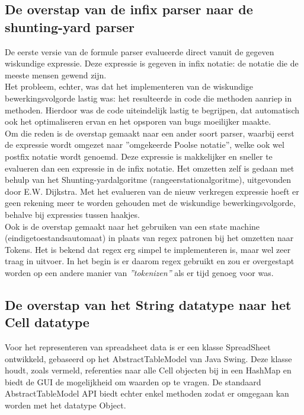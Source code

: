 \documentclass[a4paper,11pt,titlepage]{scrartcl}
\begin{document}
\subsection{De overstap van de infix parser naar de shunting-yard parser}
De eerste versie van de formule parser evalueerde direct vanuit de gegeven wiskundige expressie. Deze expressie is gegeven in infix notatie: de notatie die de meeste mensen gewend zijn.\\

Het probleem, echter, was dat het implementeren van de wiskundige bewerkingsvolgorde lastig was: het resulteerde in code die methoden aanriep in methoden. Hierdoor was de code uiteindelijk lastig te begrijpen, dat automatisch ook het optimaliseren ervan en het opsporen van bugs moeilijker maakte.\\ Om die reden is de overstap gemaakt naar een ander soort parser, waarbij eerst de expressie wordt omgezet naar ''omgekeerde Poolse notatie'', welke ook wel postfix notatie wordt genoemd. Deze expressie is makkelijker en sneller te evalueren dan een expressie in de infix notatie. Het omzetten zelf is gedaan met behulp van het Shunting-yardalgoritme (rangeerstationalgoritme), uitgevonden door E.W. Dijkstra. Met het evalueren van de nieuw verkregen expressie hoeft er geen rekening meer te worden gehouden met de wiskundige bewerkingsvolgorde, behalve bij expressies tussen haakjes.\\

Ook is de overstap gemaakt naar het gebruiken van een state machine (eindigetoestandsautomaat) in plaats van regex patronen bij het omzetten naar Tokens. Het is bekend dat regex erg simpel te implementeren is, maar wel zeer traag in uitvoer. In het begin is er daarom regex gebruikt en zou er overgestapt worden op een andere manier van \textit{''tokenizen''} als er tijd genoeg voor was.

\newpage\subsection{De overstap van het String datatype naar het Cell datatype}
Voor het representeren van spreadsheet data is er een klasse SpreadSheet ontwikkeld, gebaseerd op het AbstractTableModel van Java Swing. Deze klasse houdt, zoals vermeld, referenties naar alle Cell objecten bij in een HashMap en biedt de GUI de mogelijkheid om waarden op te vragen. De standaard AbstractTableModel API biedt echter enkel methoden zodat er omgegaan kan worden met het datatype Object.\\
\end{document}
